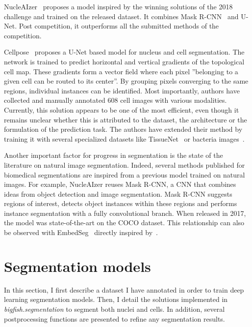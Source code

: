 NucleAIzer~\cite{hollandi_nucleaizer_2020} proposes a model inspired by the winning solutions of the 2018 challenge and trained on the released dataset.
It combines Mask R-CNN~\cite{He_2017_ICCV} and U-Net.
Post competition, it outperforms all the submitted methods of the competition.

Cellpose~\cite{stringer_cellpose_2021} proposes a U-Net based model for nucleus and cell segmentation.
The network is trained to predict horizontal and vertical gradients of the topological cell map.
These gradients form a vector field where each pixel ''belonging to a given cell can be routed to its center''.
By grouping pixels converging to the same regions, individual instances can be identified.
Most importantly, authors have collected and manually annotated 608 cell images with various modalities.
Currently, this solution appears to be one of the most efficient, even though it remains unclear whether this is attributed to the dataset, the architecture or the formulation of the prediction task.
The authors have extended their method by training it with several specialized datasets like TissueNet~\cite{Greenwald_2022} or bacteria images~\cite{cutler_omnipose_2022}.

Another important factor for progress in segmentation is the state of the literature on natural image segmentation.
Indeed, several methods published for biomedical segmentations are inspired from a previous model trained on natural images.
For example, NucleAIzer reuses Mask R-CNN, a \ac{CNN} that combines ideas from object detection and image segmentation.
Mask R-CNN suggests regions of interest, detects object instances within these regions and performs instance segmentation with a fully convolutional branch.
When released in 2017, the model was state-of-the-art on the COCO dataset.
This relationship can also be observed with EmbedSeg~\cite{Lalit_2021} directly inspired by~\cite{Neven_2019_CVPR}.

\section{Segmentation models}
\label{sec:segmentation_nuc_cell}

In this section, I first describe a dataset I have annotated in order to train deep learning segmentation models.
Then, I detail the solutions implemented in \emph{bigfish.segmentation} to segment both nuclei and cells.
In addition, several postprocessing functions are presented to refine any segmentation results.

